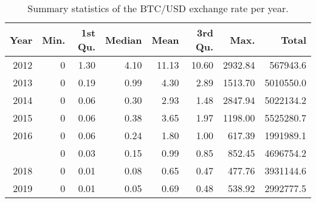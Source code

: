 \begin{table}[t]

\caption{\label{tab:}Summary statistics of the BTC/USD exchange rate per year.}
\centering
\begin{tabular}{rrrrrrrr}
\toprule
Year & Min. & 1st Qu. & Median & Mean & 3rd Qu. & Max. & Total\\
\midrule
2012 & 0 & 1.30 & 4.10 & 11.13 & 10.60 & 2932.84 & 567943.6\\
2013 & 0 & 0.19 & 0.99 & 4.30 & 2.89 & 1513.70 & 5010550.0\\
2014 & 0 & 0.06 & 0.30 & 2.93 & 1.48 & 2847.94 & 5022134.2\\
2015 & 0 & 0.06 & 0.38 & 3.65 & 1.97 & 1198.00 & 5525280.7\\
2016 & 0 & 0.06 & 0.24 & 1.80 & 1.00 & 617.39 & 1991989.1\\
\addlinespace
2017 & 0 & 0.03 & 0.15 & 0.99 & 0.85 & 852.45 & 4696754.2\\
2018 & 0 & 0.01 & 0.08 & 0.65 & 0.47 & 477.76 & 3931144.6\\
2019 & 0 & 0.01 & 0.05 & 0.69 & 0.48 & 538.92 & 2992777.5\\
\bottomrule
\end{tabular}
\end{table}
